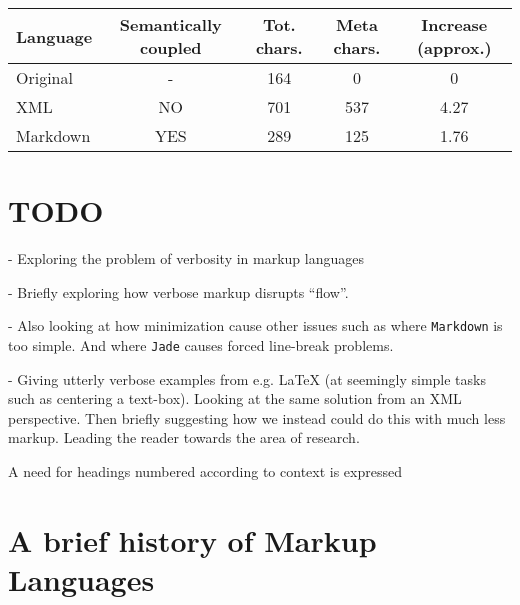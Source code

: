 \documentclass{scrreprt}
\begin{document}
\vspace{12pt}
\begin{tabular}{l c c c c}
Language
& Semantically coupled
& Tot. chars.
& Meta chars.
& Increase (approx.)
\\
\hline
Original & -   & 164 & 0   & 0\\
XML      & NO  & 701 & 537 & 4.27\\
Markdown & YES & 289 & 125 & 1.76
\end{tabular}
\vspace{12pt}






\section{TODO}
- Exploring the problem of verbosity in markup languages

- Briefly exploring how verbose markup disrupts ``flow''.

- Also looking at how minimization cause other issues such as where \texttt{Markdown} is too simple. And where \texttt{Jade} causes forced line-break problems.

- Giving utterly verbose examples from e.g. LaTeX (at seemingly simple tasks such as centering a text-box). Looking at the same solution from an XML perspective. Then briefly suggesting how we instead could do this with much less markup. Leading the reader towards the area of research.

A need for headings numbered according to context is expressed



\section{A brief history of Markup Languages}
\end{document}

